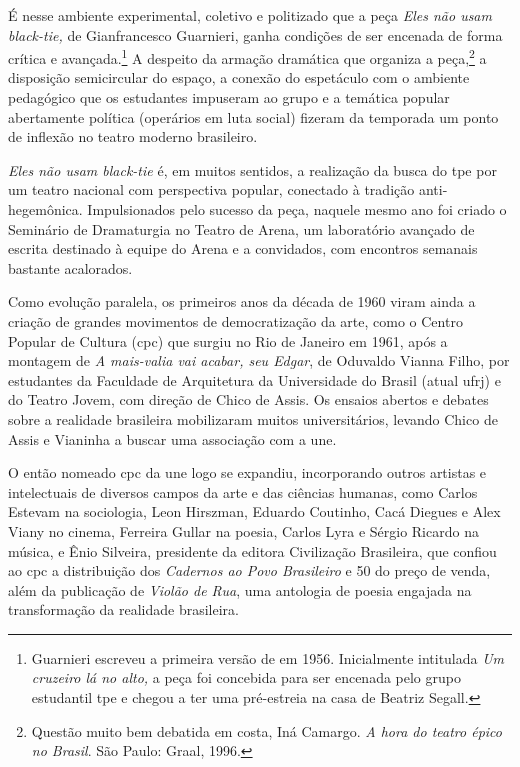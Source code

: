 É nesse ambiente experimental, coletivo e politizado que a peça
{\it Eles não usam black-tie,} de Gianfrancesco Guarnieri, ganha
condições de ser encenada de forma crítica e avançada.\footnote{Guarnieri
  escreveu a primeira versão de em 1956. Inicialmente intitulada {\it Um
  cruzeiro lá no alto,} a peça foi concebida para ser encenada pelo
  grupo estudantil {\sc tpe} e chegou a ter uma pré-estreia na casa de Beatriz
  Segall.} A despeito da armação dramática que organiza a
peça,\footnote{Questão muito bem debatida em {\sc costa}, Iná Camargo. {\it A
  hora do teatro épico no Brasil}. São Paulo: Graal, 1996.} a
disposição semicircular do espaço, a conexão do espetáculo com o
ambiente pedagógico que os estudantes impuseram ao grupo e a temática
popular abertamente política (operários em luta social) fizeram da
temporada um ponto de inflexão no teatro moderno brasileiro.

{\it Eles não usam black-tie} é, em muitos sentidos, a realização da
busca do {\sc tpe} por um teatro nacional com perspectiva popular, conectado à
tradição anti-hegemônica. Impulsionados pelo sucesso da peça, naquele
mesmo ano foi criado o Seminário de Dramaturgia no Teatro de Arena, um
laboratório avançado de escrita destinado à equipe do Arena e a
convidados, com encontros semanais bastante acalorados.

Como evolução paralela, os primeiros anos da década de 1960 viram ainda
a criação de grandes movimentos de democratização da arte, como o Centro
Popular de Cultura ({\sc cpc}) que surgiu no Rio de Janeiro em 1961, após a
montagem de {\it A mais-valia vai acabar, seu Edgar}, de Oduvaldo Vianna
Filho, por estudantes da Faculdade de Arquitetura da Universidade do
Brasil (atual {\sc ufrj}) e do Teatro Jovem, com direção de Chico de Assis. Os
ensaios abertos e debates sobre a realidade brasileira mobilizaram
muitos universitários, levando Chico de Assis e Vianinha a buscar uma
associação com a {\sc une}.

O então nomeado {\sc cpc} da {\sc une} logo se expandiu, incorporando outros
artistas e intelectuais de diversos campos da arte e das ciências
humanas, como Carlos Estevam na sociologia, Leon Hirszman, Eduardo
Coutinho, Cacá Diegues e Alex Viany no cinema, Ferreira Gullar na
poesia, Carlos Lyra e Sérgio Ricardo na música, e Ênio Silveira,
presidente da editora Civilização Brasileira, que confiou ao {\sc cpc} a
distribuição dos {\it Cadernos ao Povo Brasileiro} e 50
do preço de venda, além da publicação de {\it Violão de Rua}, uma
antologia de poesia engajada na transformação da realidade brasileira.


